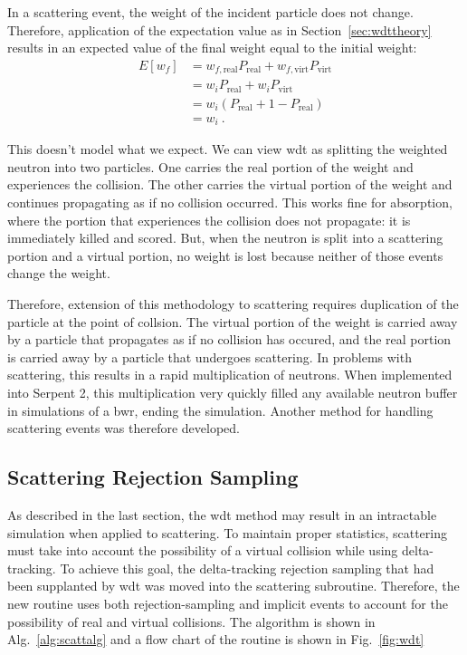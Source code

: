 In a scattering event, the weight of the incident particle does not
change. Therefore, application of the expectation value as in
Section~\ref{sec:wdttheory} results in an expected value of the final
weight equal to the initial weight:
\begin{align*}
  E[w_f] &= w_{f,\mathrm{real}}P_{\mathrm{real}} +
           w_{f,\mathrm{virt}}P_{\mathrm{virt}} \\
  &= w_iP_\mathrm{real} + w_iP_{\mathrm{virt}} \\
  &= w_i(P_\mathrm{real} + 1 -P_\mathrm{real}) \\
  &= w_i\:.
\end{align*}

This doesn't model what we expect. We can view \gls{wdt} as splitting
the weighted neutron into two particles. One carries the real portion
of the weight and experiences the collision. The other carries the
virtual portion of the weight and continues propagating as if no
collision occurred. This works fine for absorption, where the portion
that experiences the collision does not propagate: it is immediately
killed and scored. But, when the neutron is split into a scattering
portion and a virtual portion, no weight is lost because neither of
those events change the weight.

Therefore, extension of this methodology to scattering requires duplication of
the particle at the point of collsion. The virtual portion of the
weight is carried away by a particle that propagates as if no
collision has occured, and the real portion is carried away by a
particle that undergoes scattering. In problems with scattering, this
results in a rapid multiplication of neutrons. When implemented into
Serpent 2, this multiplication very quickly filled any available
neutron buffer in simulations of a \gls{bwr}, ending
the simulation. Another method for handling scattering events was therefore 
developed.

\subsection{Scattering Rejection Sampling}
\label{sec:scattering}

As described in the last section, the \gls{wdt} method may result in
an intractable simulation when applied to scattering. To maintain
proper statistics, scattering must take into account the possibility
of a virtual collision while using delta-tracking. 
To achieve this
goal, the delta-tracking rejection sampling that had been supplanted
by \gls{wdt} was moved into the scattering subroutine. Therefore, the
new routine uses both rejection-sampling and implicit events to
account for the possibility of real and virtual collisions. The
algorithm is shown in Alg.~\ref{alg:scattalg} and a flow chart of the
routine is shown in Fig.~\ref{fig:wdt}

